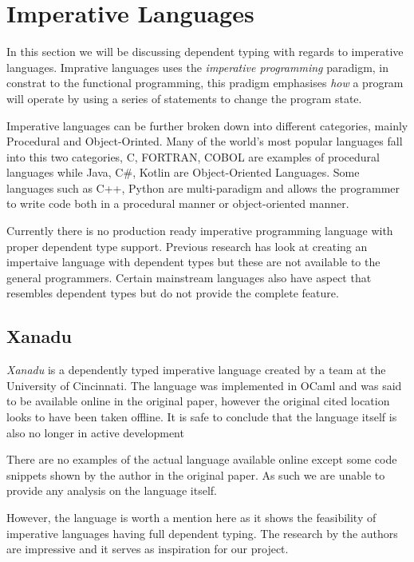 \documentclass[a4paper,12pt]{report}
\begin{document}
\section{Imperative Languages}

In this section we will be discussing dependent typing with regards to imperative 
languages. Imprative languages uses the \textit{imperative programming} 
\cite{imperativeOverview} paradigm, in constrat to the functional 
programming, this pradigm emphasises \textit{how} a program will operate 
by using a series of statements to change the program state.

\par

Imperative languages can be further broken down into different categories, 
mainly Procedural and Object-Orinted. Many of the world's most popular languages 
fall into this two categories, C, FORTRAN, COBOL are examples of procedural 
languages while Java, C#, Kotlin are Object-Oriented Languages. Some languages such 
as C++, Python are multi-paradigm and allows the programmer to write code both 
in a procedural manner or object-oriented manner. 

\par

Currently there is no production ready imperative programming language with 
proper dependent type support. Previous research has look at creating an 
impertaive language with dependent types but these are not available to the 
general programmers. Certain mainstream languages also have aspect that 
resembles dependent types but do not provide the complete feature.

\subsection{Xanadu}
\textit{Xanadu} \cite{xanadu} is a dependently typed imperative language created by a team at 
the University of Cincinnati. The language was implemented in OCaml and was 
said to be available online in the original paper, however the original cited 
location looks to have been taken offline. It is safe to conclude that 
the language itself is also no longer in active development 

\par
There are no examples of the actual language available online except some code 
snippets shown by the author in the original paper. As such we are unable to 
provide any analysis on the language itself.

\par
However, the language is worth a mention here as it shows the feasibility of 
imperative languages having full dependent typing. The research by the authors 
are impressive and it serves as inspiration for our project. 
\end{document}
